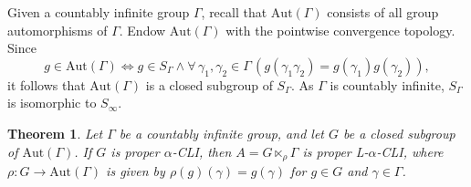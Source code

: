 \documentclass[11pt]{amsart}
\newtheorem{theorem}{Theorem}[section]
\theoremstyle{definition}
\theoremstyle{remark}
\numberwithin{equation}{section}
\def\hier#1{$#1$-CLI}
\def\aut{{\mathrm{Aut}}}
\begin{document}
Given a countably infinite group $\Gamma$, recall that $\aut(\Gamma)$ consists of all group automorphisms of $\Gamma$. Endow $\aut(\Gamma)$ with the pointwise convergence topology. Since
$$g\in\aut(\Gamma)\iff g\in S_\Gamma\land\forall\,\gamma_1,\gamma_2\in\Gamma\,(g(\gamma_1\gamma_2)=g(\gamma_1)g(\gamma_2)),$$
it follows that $\aut(\Gamma)$ is a closed subgroup of $S_\Gamma$. As $\Gamma$ is countably infinite, $S_\Gamma$ is isomorphic to $S_\infty$.
\begin{theorem}\label{semidirect product on countable group}
    Let $\Gamma$ be a countably infinite group, and let $G$ be a closed subgroup of $\aut(\Gamma)$. If $G$ is proper \hier\alpha, then $A=G\ltimes_\rho\Gamma$ is proper L-\hier\alpha, where $\rho:G\to\aut(\Gamma)$ is given by
    $\rho(g)(\gamma)=g(\gamma)$ for $g\in G$ and $\gamma\in\Gamma$.
\end{theorem}
\end{document}
